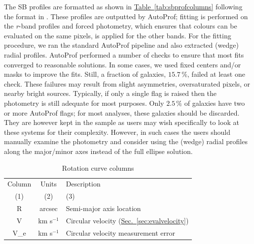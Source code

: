 \documentclass[twocolumn]{aastex631}
\newcommand{\Sec}[1]{{\protect\hyperref[sec:#1]{Sec.~\ref*{sec:#1}}}}
\newcommand{\Tab}[1]{{\protect\hyperref[tab:#1]{Table~\ref*{tab:#1}}}}
\newcommand{\wunits}[2]{\ensuremath{#1\,\text{#2}}}
\begin{document}
The SB profiles are formatted as shown in \Tab{sbprofcolumns} following the format in \citet{Stone2021b}.
These profiles are outputted by AutoProf; fitting is performed on the {\it r}-band profiles and forced photometry, which ensures that colours can be evaluated on the same pixels, is applied for the other bands.
For the fitting procedure, we ran the standard AutoProf pipeline and also extracted (wedge) radial profiles. 
AutoProf performed a number of checks to ensure that most fits converged to reasonable solutions.
In some cases, we used fixed centers and/or masks to improve the fits.
Still, a fraction of galaxies, \wunits{15.7}{\%}, failed at least one check.
These failures may result from slight asymmetries, oversaturated pixels, or nearby bright sources.
Typically, if only a single flag is raised then the photometry is still adequate for most purposes.
Only \wunits{2.5}{\%} of galaxies have two or more AutoProf flags; for most analyses, these galaxies should be discarded.
They are however kept in the sample as users may wish specifically to look at these systems for their complexity.
However, in such cases the users should manually examine the photometry and consider using the (wedge) radial profiles along the major/minor axes instead of the full ellipse solution.

\begin{table}[h]
    \centering
    \caption{Rotation curve columns}
    \begin{tabular}{ c  c  l }
    \hline
        Column & Units & Description \\ 
        (1) & (2) & (3) \\
        \hline
        R & arcsec & Semi-major axis location \\
        V & km s$^{-1}$ & Circular velocity (\Sec{evalvelocity}) \\
        V\_e & km s$^{-1}$ & Circular velocity measurement error \\
        \hline
    \end{tabular}
    \label{tab:rotationcurves}
\end{table}
\end{document}
